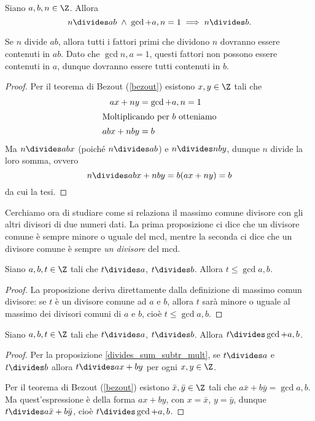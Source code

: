 \begin{proposition} \label{n_divides_product}
    Siano $a, b, n \in \Z$. Allora \begin{equation}
        n \divides ab \;\land\; \gcd{a, n} = 1 \implies n \divides b.
    \end{equation}
\end{proposition}
\begin{intuition}
    Se $n$ divide $ab$, allora tutti i fattori primi che dividono $n$ dovranno essere contenuti in $ab$. Dato che $\gcd{n, a} = 1$, questi fattori non possono essere contenuti in $a$, dunque dovranno essere tutti contenuti in $b$.
\end{intuition}
\begin{proof}
    Per il teorema di Bezout (\ref{bezout}) esistono $x, y \in \Z$ tali che 
    \begin{align*}
        ax + ny &= \gcd{a, n} = 1 \\
        \intertext{Moltiplicando per $b$ otteniamo}
        abx + nby &= b 
    \end{align*}
    Ma $n \divides abx$ (poiché $n \divides ab$) e $n \divides nby$, dunque $n$ divide la loro somma, ovvero \[
        n \divides abx + nby = b(ax + ny) = b
    \]
    da cui la tesi.
\end{proof}

Cerchiamo ora di studiare come si relaziona il massimo comune divisore con gli altri divisori di due numeri dati. La prima proposizione ci dice che un divisore comune è sempre minore o uguale del mcd, mentre la seconda ci dice che un divisore comune è sempre \emph{un divisore} del mcd.

\begin{proposition} \label{greatest_common_divisor}
    Siano $a, b, t \in \Z$ tali che $t \divides a$, $t \divides b$. Allora $t \leq \gcd{a, b}$.
\end{proposition}
\begin{proof}
    La proposizione deriva direttamente dalla definizione di massimo comun divisore: se $t$ è un divisore comune ad $a$ e $b$, allora $t$ sarà minore o uguale al massimo dei divisori comuni di $a$ e $b$, cioè $t \leq \gcd{a, b}$.
\end{proof}

\begin{proposition} \label{divisori_dividono_gcd}
    Siano $a, b, t \in \Z$ tali che $t \divides a$, $t \divides b$. Allora $t \divides \gcd{a, b}$.
\end{proposition}
\begin{proof}
    Per la proposizione \ref{divides_sum_subtr_mult}, se $t \divides a$ e $t \divides b$ allora $t \divides ax+by$ per ogni $x, y \in \Z$.

    Per il teorema di Bezout (\ref{bezout}) esistono $\bar{x}, \bar{y} \in \Z$ tali che $a\bar{x}+b\bar{y} = \gcd{a, b}$. Ma quest'espressione è della forma $ax + by$, con $x = \bar{x}$, $y = \bar{y}$, dunque 
    $t \divides a\bar{x} + b\bar{y}$, cioè $t \divides \gcd{a, b}$.
\end{proof}

